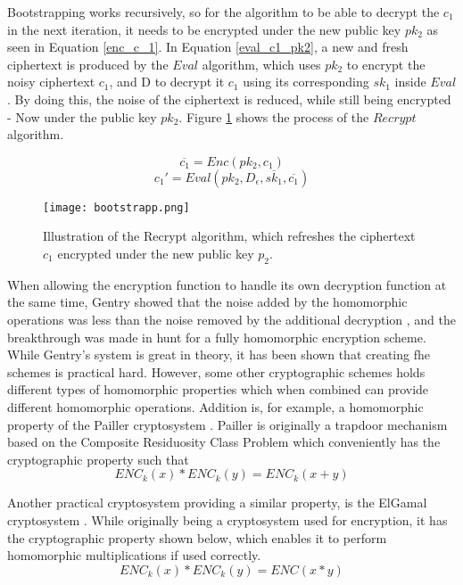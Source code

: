 Bootstrapping works recursively, so for the algorithm to be able to decrypt the $c_1$ in the next iteration, it needs to be encrypted under the new public key $pk_2$ as seen in Equation \ref{enc_c_1}. In Equation \ref{eval_c1_pk2}, a new and fresh ciphertext is produced by the $Eval$ algorithm, which uses $pk_2$ to encrypt the noisy ciphertext $c_1$, and D to decrypt it $c_1$ using its corresponding $sk_1$ inside $Eval$. By doing this, the noise of the ciphertext is reduced, while still being encrypted - Now under the public key $pk_2$. Figure \ref{recrypt_function} shows the process of the $Recrypt$ algorithm.


\begin{equation}
\label{enc_c_1}
\overline{c_1} = Enc(pk_2, c_1)
\end{equation}
\begin{equation}
\label{eval_c1_pk2}
c_1' = Eval(pk_2, D_{\epsilon}, \overline{sk_1}, \overline{c_1})
\end{equation}


\begin{figure}[h]
	\centering
	\texttt{[image: bootstrapp.png]}
	\caption{Illustration of the Recrypt algorithm, which refreshes the ciphertext $c_1$ encrypted under the new public key $p_2$.}
	\label{recrypt_function}
\end{figure}



When allowing the encryption function to handle its own decryption function at the same time, Gentry showed that the noise added by the homomorphic operations was less than the noise removed by the additional decryption \cite{Gentry_computing_arb_func_enc_data}, and the breakthrough was made in hunt for a fully homomorphic encryption scheme. While Gentry's system is great in theory, it has been shown that creating \gls{fhe} schemes is practical hard. However, some other cryptographic schemes holds different types of homomorphic properties which when combined can provide different homomorphic operations. Addition is, for example, a homomorphic property of the Pailler cryptosystem \citep{Paillier}. Pailler is originally a trapdoor mechanism based on the Composite Residuosity Class Problem which conveniently has the cryptographic property such that \[ENC_k(x) * ENC_k(y) = ENC_k(x + y)\]

Another practical cryptosystem providing a similar property, is the ElGamal cryptosystem \cite{elgamal}. While originally being a cryptosystem used for encryption, it has the cryptographic property shown below, which enables it to perform homomorphic multiplications if used correctly.  \[ENC_k(x) * ENC_k(y) = ENC(x * y)\]

